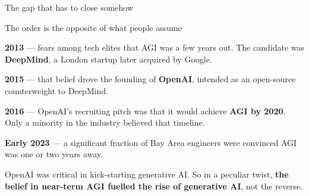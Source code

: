 \documentclass[aspectratio=169,11pt,t]{beamer}
\begin{document}
\begin{frame}[shrink=25]{The gap that has to close somehow}
\begin{minipage}[t]{0.494\textwidth}
\end{minipage}%
\hfill
\begin{minipage}[t]{0.494\textwidth}
\end{minipage}%
\begin{iquote}
\end{iquote}
\end{frame}

\begin{frame}[shrink=25]{The order is the opposite of what people assume}
\begin{isteps}
\item \textbf{2013} --- fears among tech elites that AGI was a few years out. The candidate was \textbf{DeepMind}, a London startup later acquired by Google.
\item \textbf{2015} --- that belief drove the founding of \textbf{OpenAI}, intended as an open-source counterweight to DeepMind.
\item \textbf{2016} --- OpenAI's recruiting pitch was that it would achieve \textbf{AGI by 2020}. Only a minority in the industry believed that timeline.
\item \textbf{Early 2023} --- a significant fraction of Bay Area engineers were convinced AGI was one or two years away.
\end{isteps}
\begin{iband}[amber]
OpenAI was critical in kick-starting generative AI. So in a peculiar twist, \textbf{the belief in near-term AGI fuelled the rise of generative AI}, not the reverse.
\end{iband}
\end{frame}
\end{document}
